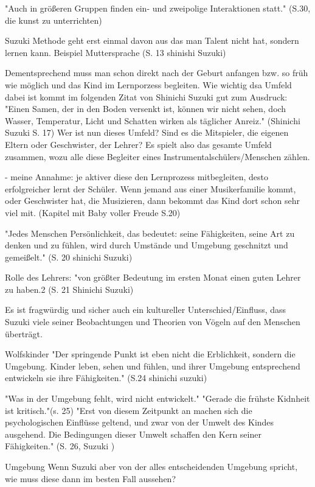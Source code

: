 "Auch in größeren Gruppen finden ein- und zweipolige Interaktionen statt."
(S.30, die kunst zu unterrichten)

Suzuki Methode geht erst einmal davon aus das man Talent nicht hat, sondern
lernen kann. Beispiel Muttersprache (S. 13 shinishi Suzuki)

Dementsprechend muss man schon direkt nach der Geburt anfangen bzw. so früh wie
möglich und das Kind im Lernporzess begleiten. Wie wichtig dsa Umfeld dabei ist
kommt im folgenden Zitat von Shinichi Suzuki gut zum Ausdruck: "Einen Samen, der
in den Boden versenkt ist, können wir nicht sehen, doch Wasser, Temperatur,
Licht und Schatten wirken als täglicher Anreiz." (Shinichi Suzuki S. 17)
Wer ist nun dieses Umfeld? Sind es die Mitspieler, die eigenen Eltern oder
Geschwister, der Lehrer? Es spielt also das gesamte Umfeld zusammen, wozu alle
diese Begleiter eines Instrumentalschülers/Menschen zählen. 

- meine Annahme: je aktiver diese den Lernprozess mitbegleiten, desto
erfolgreicher lernt der Schüler. Wenn jemand aus einer Musikerfamilie kommt,
oder Geschwister hat, die Musizieren, dann bekommt das Kind dort schon sehr viel
mit. (Kapitel mit Baby voller Freude S.20)

"Jedes Menschen Persönlichkeit, das bedeutet: seine Fähigkeiten, seine Art zu
denken und zu fühlen, wird durch Umstände und Umgebung geschnitzt und
gemeißelt." (S. 20 shinichi Suzuki)

Rolle des Lehrers: "von größter Bedeutung im ersten Monat einen guten Lehrer zu
haben.2 (S. 21 Shinichi Suzuki)

Es ist fragwürdig und sicher auch ein kultureller Unterschied/Einfluss, dass Suzuki viele seiner Beobachtungen und Theorien von
Vögeln auf den Menschen überträgt. 

Wolfskinder
"Der springende Punkt ist eben nicht die Erblichkeit, sondern die Umgebung.
Kinder leben, sehen und fühlen, und ihrer Umgebung entsprechend entwickeln sie
ihre Fähigkeiten." (S.24 shinichi suzuki)

"Was in der Umgebung fehlt, wird nicht entwickelt." 
"Gerade die frühste Kidnheit ist kritisch."(s. 25)
"Erst von diesem Zeitpunkt an machen sich die psychologischen Einflüsse geltend,
und zwar von der Umwelt des Kindes ausgehend. Die Bedingungen dieser Umwelt
schaffen den Kern seiner Fähigkeiten." (S. 26, Suzuki )

Umgebung
Wenn Suzuki aber von der alles entscheidenden Umgebung spricht, wie muss diese
dann im besten Fall aussehen? 

